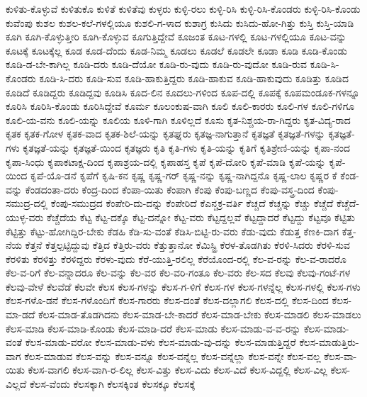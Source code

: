 {ಕುಳಿತು-ಕೊಳ್ಳುವೆ
ಕುಳಿತುಕೊ
ಕುಳಿತೆ
ಕುಳಿತೆವು
ಕುಳ್ಳರು
ಕುಳ್ಳಿ-ರಲು
ಕುಳ್ಳಿ-ರಿಸಿ
ಕುಳ್ಳಿ-ರಿಸಿ-ಕೊಂಡರು
ಕುಳ್ಳಿ-ರಿಸಿ-ಕೊಂಡು
ಕುವೆಂಪು
ಕುಶಲ
ಕುಶಲ-ಕಲೆ-ಗಳಲ್ಲಿಯೂ
ಕುಶಲಿ-ಗ-ಳಾದ
ಕುಶಾಗ್ರ
ಕುಸಿದು
ಕುಸಿದು-ಹೋ-ಗಿತ್ತು
ಕುಸ್ತಿ
ಕುಸ್ತಿ-ಯಾಡಿ
ಕೂಗಿ
ಕೂಗಿ-ಕೊಳ್ಳುತ್ತೀರಿ
ಕೂಗಿ-ಕೊಳ್ಳುವ
ಕೂಗುತ್ತಿದ್ದೇವೆ
ಕೂಜಂತ
ಕೂಟ-ಗಳಲ್ಲಿ
ಕೂಟ-ಗಳಲ್ಲಿಯೂ
ಕೂಟ-ವನ್ನು
ಕೂಟಕ್ಕೆ
ಕೂಟಕ್ಕೆಲ್ಲ
ಕೂಡ
ಕೂಡ-ದೆಂದು
ಕೂಡ-ನಿಮ್ಮ
ಕೂಡಲು
ಕೂಡಲೆ
ಕೂಡಲೇ
ಕೂಡಾ
ಕೂಡಿ
ಕೂಡಿ-ಕೊಂಡು
ಕೂಡಿ-ಡ-ಬೇ-ಕಾಗಿಲ್ಲ
ಕೂಡಿ-ದರು
ಕೂಡಿ-ದೆಯೋ
ಕೂಡಿ-ರು-ವುದು
ಕೂಡಿ-ರು-ವುದೋ
ಕೂಡಿ-ರುವ
ಕೂಡಿ-ಸಿ-ಕೊಂಡರು
ಕೂಡಿ-ಸಿ-ದರು
ಕೂಡಿ-ಸುವ
ಕೂಡಿ-ಹಾಕುತ್ತಿದ್ದರು
ಕೂಡಿ-ಹಾಕುವ
ಕೂಡಿ-ಹಾಕುವುದು
ಕೂಡಿತ್ತು
ಕೂಡಿದ
ಕೂಡಿದೆ
ಕೂಡಿದ್ದರು
ಕೂಡಿದ್ದವು
ಕೂಡಿಸಿ
ಕೂದ-ಲಿನ
ಕೂದಲು-ಗಳಿಂದ
ಕೂಪ-ದಲ್ಲಿ
ಕೂಪಕ್ಕೆ
ಕೂಪಮಂಡೂಕ-ಗಳನ್ನೂ
ಕೂರಿಸಿ
ಕೂರಿಸಿ-ಕೊಂಡು
ಕೂರಿಸಿದ್ದೇವೆ
ಕೂರ್ಮ
ಕೂಲಂಕುಷ-ವಾಗಿ
ಕೂಲಿ
ಕೂಲಿ-ಕಾರರು
ಕೂಲಿ-ಗಳ
ಕೂಲಿ-ಗಳಿಗೂ
ಕೂಲಿ-ಯ-ವನು
ಕೂಲಿ-ಯನ್ನು
ಕೂಲಿಯ
ಕೂಳಿ-ಗಾಗಿ
ಕೂಳಿಲ್ಲದೆ
ಕೂಸು
ಕೃತ-ನಿಶ್ಚಯ-ರಾ-ಗಿದ್ದರು
ಕೃತ-ವಿದ್ಯ-ರಾದ
ಕೃತಕ
ಕೃತಕ-ಗೋಳ
ಕೃತಕ-ವಾದ
ಕೃತಕ-ಶಿಲೆ-ಯನ್ನು
ಕೃತಘ್ನರು
ಕೃತಜ್ಞ-ನಾಗುತ್ತಾನೆ
ಕೃತಜ್ಞತೆ
ಕೃತಜ್ಞತೆ-ಗಳನ್ನು
ಕೃತಜ್ಞತೆ-ಗಳು
ಕೃತಜ್ಞತೆ-ಯನ್ನು
ಕೃತಜ್ಞತೆ-ಯಿಂದ
ಕೃತಜ್ಞರು
ಕೃತಿ
ಕೃತಿ-ಗಳು
ಕೃತಿ-ಯನ್ನು
ಕೃತಿಗೆ
ಕೃತಿಶ್ರೇಣಿ-ಯನ್ನು
ಕೃಪಾ-ನಂದ
ಕೃಪಾ-ಸಿಂಧು
ಕೃಪಾಕಟಾಕ್ಷ-ದಿಂದ
ಕೃಪಾಶ್ರಯ-ದಲ್ಲಿ
ಕೃಪಾಹಸ್ತ
ಕೃಪೆ
ಕೃಪೆ-ದೋರಿ
ಕೃಪೆ-ಮಾಡಿ
ಕೃಪೆ-ಯನ್ನು
ಕೃಪೆ-ಯಿಂದ
ಕೃಪೆ-ಯೊ-ಡನೆ
ಕೃಪೆಗೆ
ಕೃಷಿ-ಕನ
ಕೃಷ್ಣ
ಕೃಷ್ಣ-ಗರ್
ಕೃಷ್ಣ-ನನ್ನು
ಕೃಷ್ಣ-ನಾಗಿದ್ದನೊ
ಕೃಷ್ಣ-ಲಾಲ
ಕೃಷ್ಣರ
ಕೆ
ಕೆಂಡ-ವನ್ನು
ಕೆಂಡದಂತಾ-ದರು
ಕೆಂದ್ರ-ದಿಂದ
ಕೆಂಪಾ-ಯಿತು
ಕೆಂಪಾಗಿ
ಕೆಂಪು
ಕೆಂಪು-ಬಣ್ಣದ
ಕೆಂಪು-ವಸ್ತ್ರ-ದಿಂದ
ಕೆಂಪು-ಸಮುದ್ರ-ದಲ್ಲಿ
ಕೆಂಪು-ಸಮುದ್ರದ
ಕೆಂಪೇರಿ-ದು-ದನ್ನು
ಕೆಂಪೇರಿದೆ
ಕೆಎನ್ಚಕ್ರ-ವರ್ತಿ
ಕೆಚ್ಚದೆ
ಕೆಚ್ಚನ್ನು
ಕೆಚ್ಚು
ಕೆಚ್ಚೆದೆ
ಕೆಚ್ಚೆದೆ-ಯುಳ್ಳ-ವರು
ಕೆಚ್ಚೆದೆಯ
ಕೆಟ್ಟ
ಕೆಟ್ಟ-ದಕ್ಕೊ
ಕೆಟ್ಟ-ದನ್ನೋ
ಕೆಟ್ಟ-ವರು
ಕೆಟ್ಟದ್ದಲ್ಲವೆ
ಕೆಟ್ಟದ್ದಾದರೆ
ಕೆಟ್ಟದ್ದು
ಕೆಟ್ಟವೂ
ಕೆಟ್ಟಿತು
ಕೆಟ್ಟಿತ್ತು
ಕೆಟ್ಟು-ಹೋಗಿದ್ದಿರ-ಬೇಕು
ಕೆಡಹಿ
ಕೆಡಿ-ಸು-ವಂತೆ
ಕೆಡಿಸಿ-ಬಿಟ್ಟಿ-ರು-ವರು
ಕೆಡು-ವುದು
ಕೆಡುತ್ತ
ಕೆಣಕಿ-ದಾಗ
ಕೆತ್ತ-ನೆಯ
ಕೆತ್ತನೆ
ಕೆತ್ತಲ್ಪಟ್ಟಿದ್ದುವು
ಕೆತ್ತಿದ
ಕೆತ್ತಿರು-ವರು
ಕೆತ್ತುತ್ತಾನೋ
ಕೆಮಿಸ್ಟ್ರಿ
ಕೆರಳ-ತೊಡಗಿತು
ಕೆರಳಿ-ಸಿದರು
ಕೆರಳಿ-ಸುವ
ಕೆರಳಿತು
ಕೆರಳಿತ್ತು
ಕೆರಳಿದ್ದರು
ಕೆರಳು-ವುದು
ಕೆರೆ-ಯುತ್ತಿ-ರಲಿಲ್ಲ
ಕೆರೆಯೊಂದ-ರಲ್ಲಿ
ಕೆಲ-ವ-ರನ್ನು
ಕೆಲ-ವ-ರಾದರೊ
ಕೆಲ-ವ-ರಿಗೆ
ಕೆಲ-ವನ್ನಾದರೂ
ಕೆಲ-ವನ್ನು
ಕೆಲ-ವರ
ಕೆಲ-ವರಿ-ಗಂತೂ
ಕೆಲ-ವರು
ಕೆಲ-ಸದ
ಕೆಲವು
ಕೆಲವು-ಗಂಟೆ-ಗಳ
ಕೆಲವು-ವೇಳೆ
ಕೆಲವೆಡೆ
ಕೆಲವೇ
ಕೆಲಸ
ಕೆಲಸ-ಗಳನ್ನು
ಕೆಲಸ-ಗ-ಳಿಗೆ
ಕೆಲಸ-ಗಳ
ಕೆಲಸ-ಗಳನ್ನೆಲ್ಲ
ಕೆಲಸ-ಗಳಲ್ಲಿ
ಕೆಲಸ-ಗಳು
ಕೆಲಸ-ಗಳೊ-ಡನೆ
ಕೆಲಸ-ಗಳೊಂದಿಗೆ
ಕೆಲಸ-ಗಾರರು
ಕೆಲಸ-ದಂತೆ
ಕೆಲಸ-ದಲ್ಲಾಗಲಿ
ಕೆಲಸ-ದಲ್ಲಿ
ಕೆಲಸ-ದಿಂದ
ಕೆಲಸ-ಮಾ-ಡದೆ
ಕೆಲಸ-ಮಾಡ-ತೊಡಗಿದನು
ಕೆಲಸ-ಮಾಡ-ಬೇ-ಕಾದರೆ
ಕೆಲಸ-ಮಾಡ-ಬೇಕು
ಕೆಲಸ-ಮಾಡಲಿ
ಕೆಲಸ-ಮಾಡಲು
ಕೆಲಸ-ಮಾಡಿ
ಕೆಲಸ-ಮಾಡಿ-ಕೊಂಡು
ಕೆಲಸ-ಮಾಡಿ-ದರೆ
ಕೆಲಸ-ಮಾಡು
ಕೆಲಸ-ಮಾಡು-ವ-ವ-ರನ್ನು
ಕೆಲಸ-ಮಾಡು-ವಂತೆ
ಕೆಲಸ-ಮಾಡು-ವರೋ
ಕೆಲಸ-ಮಾಡು-ವಳು
ಕೆಲಸ-ಮಾಡು-ವು-ದನ್ನು
ಕೆಲಸ-ಮಾಡುತ್ತಿದ್ದರೆ
ಕೆಲಸ-ಮಾಡುತ್ತಿರು-ವಾಗ
ಕೆಲಸ-ಮಾಡುವ
ಕೆಲಸ-ವನ್ನು
ಕೆಲಸ-ವನ್ನೂ
ಕೆಲಸ-ವನ್ನೆಲ್ಲ
ಕೆಲಸ-ವನ್ನೆಲ್ಲಾ
ಕೆಲಸ-ವನ್ನೇ
ಕೆಲಸ-ವಲ್ಲ
ಕೆಲಸ-ವಾ-ಯಿತು
ಕೆಲಸ-ವಾಗಲಿ
ಕೆಲಸ-ವಾಗಿ-ರ-ಲಿಲ್ಲ
ಕೆಲಸ-ವಿತ್ತು
ಕೆಲಸ-ವಿದು
ಕೆಲಸ-ವಿದೆ
ಕೆಲಸ-ವಿದ್ದಲ್ಲಿ
ಕೆಲಸ-ವಿಲ್ಲ
ಕೆಲಸ-ವಿಲ್ಲದೆ
ಕೆಲಸ-ವೆಂದು
ಕೆಲಸಕ್ಕಾಗಿ
ಕೆಲಸಕ್ಕಿಂತ
ಕೆಲಸಕ್ಕೂ
ಕೆಲಸಕ್ಕೆ
}
